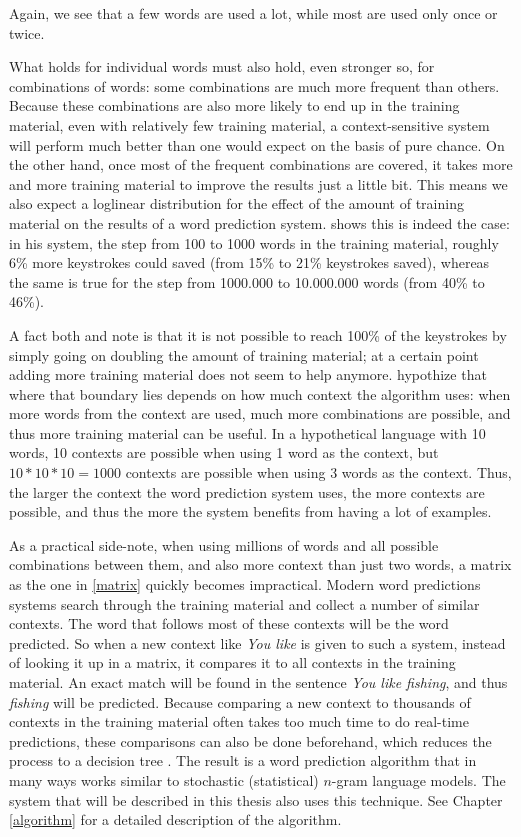 \documentclass[11pt]{article}
\begin{document}
Again, we see that a few words are used a lot, while most are used only once or twice.

What holds for individual words must also hold, even stronger so, for combinations of words: some combinations are much more frequent than others. Because these combinations are also more likely to end up in the training material, even with relatively few training material, a context-sensitive system will perform much better than one would expect on the basis of pure chance. On the other hand, once most of the frequent combinations are covered, it takes more and more training material to improve the results just a little bit. This means we also expect a loglinear distribution for the effect of the amount of training material on the results of a word prediction system.  shows this is indeed the case: in his system, the step from 100 to 1000 words in the training material, roughly 6\% more keystrokes could saved (from 15\% to 21\% keystrokes saved), whereas the same is true for the step from 1000.000 to 10.000.000 words (from 40\% to 46\%).

A fact both  and  note is that it is not possible to reach 100\% of the keystrokes by simply going on doubling the amount of training material; at a certain point adding more training material does not seem to help anymore.  hypothize that where that boundary lies depends on how much context the algorithm uses: when more words from the context are used, much more combinations are possible, and thus more training material can be useful. In a hypothetical language with 10 words, 10 contexts are possible when using 1 word as the context, but $10*10*10 = 1000$ contexts are possible when using 3 words as the context. Thus, the larger the context the word prediction system uses, the more contexts are possible, and thus the more the system benefits from having a lot of examples.

As a practical side-note, when using millions of words and all possible combinations between them, and also more context than just two words, a matrix as the one in \ref{matrix} quickly becomes impractical. Modern word predictions systems search through the training material and collect a number of similar contexts. The word that follows most of these contexts will be the word predicted. So when a new context like \emph{You like} is given to such a system, instead of looking it up in a matrix, it compares it to all contexts in the training material. An exact match will be found in the sentence \emph{You like fishing}, and thus \emph{fishing} will be predicted. Because comparing a new context to thousands of contexts in the training material often takes too much time to do real-time predictions, these comparisons can also be done beforehand, which reduces the process to a decision tree . The result is a word prediction algorithm that in many ways works similar to stochastic (statistical) $n$-gram language models. The system that will be described in this thesis also uses this technique. See Chapter \ref{algorithm} for a detailed description of the algorithm.
\end{document}
